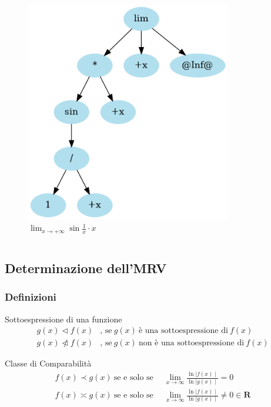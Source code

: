 \documentclass[aspectratio=149]{beamer}
\begin{document}
\begin{frame}
\begin{columns}
\begin{column}{0.45\textwidth}
\begin{figure}
					\includegraphics[width=0.8\textwidth]{pres_img/prima_semplif.png}
					\caption{\(\lim_{x \to +\infty}{\sin{\frac{1}{x}} \cdot x}\)}
				\end{figure}
			\end{column}
		\end{columns}
	\end{frame}

	\subsection{Determinazione dell'MRV}
	
	\begin{frame}
		\frametitle{Definizioni}
		\begin{block}{Sottoespressione di una funzione}
			\[
			\begin{aligned}
				g(x) \triangleleft f(x)&\text{, se} \: g(x) \: \text{è una sottoespressione di} \: f(x) \\
				g(x) \ntriangleleft f(x)&\text{, se} \: g(x) \: \text{non è una sottoespressione di} \: f(x)
			\end{aligned}
			\]
		\end{block}
		\begin{block}{Classe di Comparabilità}
			\[
			\begin{aligned}
				f(x) \prec g(x) \: \text{se e solo se} \enspace &\lim_{x \to \infty}{\frac{\ln{\mid f(x)\mid}}{\ln{\mid g(x)\mid}}} = 0 \\ 
				f(x) \asymp g(x) \: \text{se e solo se} \enspace &\lim_{x \to \infty}{\frac{\ln{\mid f(x)\mid}}{\ln{\mid g(x)\mid}}} \neq 0 \in \mathbf{R}
			\end{aligned} \tag{2} \label{defn:comparability}
			\] 
		\end{block}
	\end{frame}
\end{document}
